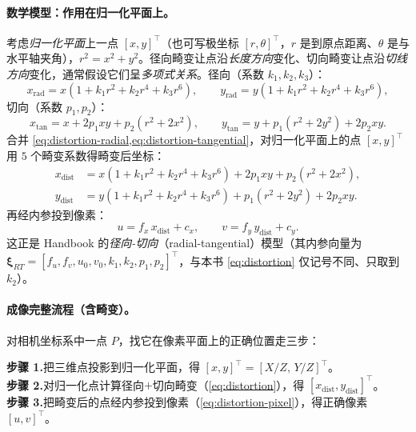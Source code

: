 \paragraph{数学模型：作用在归一化平面上。}
考虑\emph{归一化平面}上一点 $[x,y]^\top$（也可写极坐标 $[r,\theta]^\top$，$r$ 是到原点距离、$\theta$ 是与水平轴夹角），$r^2=x^2+y^2$\cite{gaoxiang2019slam14}。径向畸变让点沿\emph{长度方向}变化、切向畸变让点沿\emph{切线方向}变化，通常假设它们呈\emph{多项式关系}。径向（系数 $k_1,k_2,k_3$）：
\begin{equation}
  x_{\text{rad}}=x(1+k_1r^2+k_2r^4+k_3r^6),\qquad
  y_{\text{rad}}=y(1+k_1r^2+k_2r^4+k_3r^6),
  \label{eq:distortion-radial}
\end{equation}
切向（系数 $p_1,p_2$）：
\begin{equation}
  x_{\text{tan}}=x+2p_1xy+p_2(r^2+2x^2),\qquad
  y_{\text{tan}}=y+p_1(r^2+2y^2)+2p_2xy.
  \label{eq:distortion-tangential}
\end{equation}
合并 \cref{eq:distortion-radial,eq:distortion-tangential}，对归一化平面上的点 $[x,y]^\top$ 用 $5$ 个畸变系数得畸变后坐标：
\begin{equation}
  \begin{aligned}
  x_{\text{dist}}&=x(1+k_1r^2+k_2r^4+k_3r^6)+2p_1xy+p_2(r^2+2x^2),\\
  y_{\text{dist}}&=y(1+k_1r^2+k_2r^4+k_3r^6)+p_1(r^2+2y^2)+2p_2xy.
  \end{aligned}
  \label{eq:distortion}
\end{equation}
再经内参投到像素：
\begin{equation}
  u=f_x\,x_{\text{dist}}+c_x,\qquad v=f_y\,y_{\text{dist}}+c_y.
  \label{eq:distortion-pixel}
\end{equation}
这正是 Handbook 的\emph{径向-切向}（radial-tangential）模型\cite{carlone2026handbook}（其内参向量为 $\boldsymbol\xi_{RT}=[f_u,f_v,u_0,v_0,k_1,k_2,p_1,p_2]^\top$，与本书 \cref{eq:distortion} 仅记号不同、只取到 $k_2$）。

\paragraph{成像完整流程（含畸变）。}
对相机坐标系中一点 $P$，找它在像素平面上的正确位置走三步\cite{gaoxiang2019slam14}：

\begin{algo}[含畸变的成像三步]\label{alg:cam-distort}
\textbf{步骤 1.}\;把三维点投影到归一化平面，得 $[x,y]^\top=[X/Z,\,Y/Z]^\top$。\\
\textbf{步骤 2.}\;对归一化点计算径向$+$切向畸变（\cref{eq:distortion}），得 $[x_{\text{dist}},y_{\text{dist}}]^\top$。\\
\textbf{步骤 3.}\;把畸变后的点经内参投到像素（\cref{eq:distortion-pixel}），得正确像素 $[u,v]^\top$。
\end{algo}

